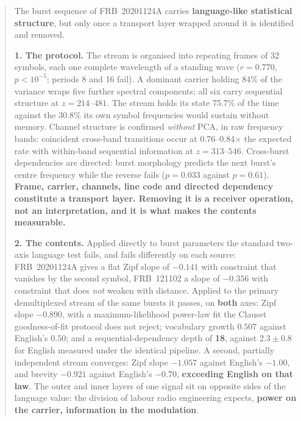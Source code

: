 \documentclass[11pt,a4paper]{article}
\begin{document}
\begin{abstract}
\noindent
The burst sequence of FRB~20201124A carries \textbf{language-like statistical
structure}, but only once a transport layer wrapped around it is identified and
removed.

\smallskip
\noindent
\textbf{1. The protocol.} The stream is organised into repeating frames of 32 symbols,
each one complete wavelength of a standing wave ($r = 0.770$, $p < 10^{-5}$; periods 8
and 16 fail). A dominant carrier holding 84\% of the variance wraps five further
spectral components; all six carry sequential structure at $z = 214$--$481$. The stream
holds its state 75.7\% of the time against the 30.8\% its own symbol frequencies
would sustain without memory. Channel structure is
confirmed \emph{without} PCA, in raw frequency bands: coincident cross-band transitions
occur at 0.76--0.84$\times$ the expected rate with within-band sequential information at
$z = 313$--$546$. Cross-burst dependencies are directed: burst morphology predicts the
next burst's centre frequency while the reverse fails ($p = 0.033$ against $p = 0.61$).
\textbf{Frame, carrier, channels, line code and directed dependency constitute a
transport layer. Removing it is a receiver operation, not an interpretation, and it is
what makes the contents measurable.}

\smallskip
\noindent
\textbf{2. The contents.} Applied directly to burst parameters the standard two-axis
language test fails, and fails differently on each source: FRB~20201124A gives a flat
Zipf slope of $-0.141$ with constraint that vanishes by the second symbol, FRB~121102 a
slope of $-0.356$ with constraint that does \emph{not} weaken with distance. Applied to
the primary demultiplexed stream of the same bursts it passes, on \textbf{both} axes:
Zipf slope $-0.890$, with a maximum-likelihood power-law fit the Clauset
goodness-of-fit protocol does not reject; vocabulary growth $\mathbf{0.507}$ against
English's $0.50$; and a
sequential-dependency depth of \textbf{18}, against $\mathbf{2.3 \pm 0.8}$ for English
measured under the identical pipeline. A second, partially independent stream
converges: Zipf slope $\mathbf{-1.057}$ against English's $-1.00$, and brevity
$\mathbf{-0.921}$ against English's $-0.70$, \textbf{exceeding English on that law}.
The outer and inner layers of one signal sit on opposite sides of the language value:
the division of labour radio engineering expects, \textbf{power on the carrier,
information in the modulation}.


\end{abstract}
\end{document}
